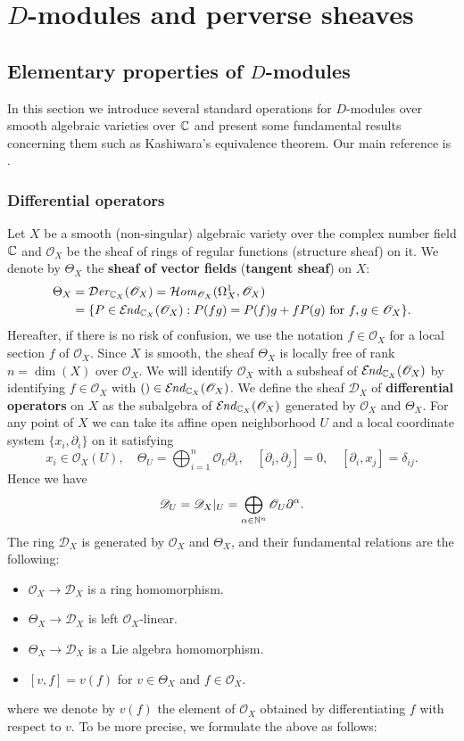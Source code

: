 \chapter{\texorpdfstring{$D$}{D}-modules and perverse sheaves}
\section{Elementary properties of \texorpdfstring{$D$}{D}-modules}
In this section we introduce several standard operations for $D$-modules over smooth algebraic varieties over $\mathbb{C}$ and present some fundamental results concerning them such as Kashiwara's equivalence theorem. Our main reference is \cite{hotta_Dmodule}.
\subsection{Differential operators}
Let $X$ be a smooth (non-singular) algebraic variety over the complex number field $\mathbb{C}$ and $\mathscr{O}_X$ be the sheaf of rings of regular functions (structure sheaf) on it. We denote by $\Theta_X$ the \textbf{sheaf of vector fields} (\textbf{tangent sheaf}) on $X$:
\begin{align*}
\Theta_X&=\operatorname{\mathcal{D}\hspace*{-0.2pt}\textit{er}\hspace{0.5pt}}_{\mathbb{C}_X}(\mathscr{O}_X)=\operatorname{\mathcal{H}\hspace*{-0.4pt}\textit{om}\hspace{0.5pt}}_{\mathscr{O}_X}(\Omega_X^1,\mathscr{O}_X)\\
&=\{P\in\operatorname{\mathcal{E}\hspace*{-1pt}\textit{nd}\hspace{0.5pt}}_{\mathbb{C}_X}(\mathscr{O}_X):\text{$P(fg)=P(f)g+fP(g)$ for $f,g\in\mathscr{O}_X$}\}.
\end{align*}
Hereafter, if there is no risk of confusion, we use the notation $f\in\mathscr{O}_X$ for a local section $f$ of $\mathscr{O}_X$. Since $X$ is smooth, the sheaf $\Theta_X$ is locally free of rank $n=\dim(X)$ over $\mathscr{O}_X$. We will identify $\mathscr{O}_X$ with a subsheaf of $\operatorname{\mathcal{E}\hspace*{-1pt}\textit{nd}\hspace{0.5pt}}_{\mathbb{C}_X}(\mathscr{O}_X)$ by identifying $f\in\mathscr{O}_X$ with $()\in\operatorname{\mathcal{E}\hspace*{-1pt}\textit{nd}\hspace{0.5pt}}_{\mathbb{C}_X}(\mathscr{O}_X)$. We define the sheaf $\mathscr{D}_X$ of \textbf{differential operators} on $X$ as the subalgebra of $\operatorname{\mathcal{E}\hspace*{-1pt}\textit{nd}\hspace{0.5pt}}_{\mathbb{C}_X}(\mathscr{O}_X)$ generated by $\mathscr{O}_X$ and $\Theta_X$. For any point of $X$ we can take its affine open neighborhood $U$ and a local coordinate system $\{x_i,\partial_i\}$ on it satisfying
\[x_i\in\mathscr{O}_X(U),\quad \Theta_U=\bigoplus_{i=1}^{n}\mathscr{O}_U\partial_i,\quad [\partial_i,\partial_j]=0,\quad [\partial_i,x_j]=\delta_{ij}.\]
Hence we have 
\[\mathscr{D}_U=\mathscr{D}_X|_U=\bigoplus_{\alpha\in\mathbb{N}^n}\mathscr{O}_U\partial^\alpha.\]
The ring $\mathscr{D}_X$ is generated by $\mathscr{O}_X$ and $\Theta_X$, and their fundamental relations are the following:
\begin{itemize}
    \item $\mathscr{O}_X\to\mathscr{D}_X$ is a ring homomorphism.
    \item $\Theta_X\to\mathscr{D}_X$ is left $\mathscr{O}_X$-linear.
    \item $\Theta_X\to\mathscr{D}_X$ is a Lie algebra homomorphism.
    \item $[v,f]=v(f)$ for $v\in\Theta_X$ and $f\in\mathscr{O}_X$.
\end{itemize}
where we denote by $v(f)$ the element of $\mathscr{O}_X$ obtained by differentiating $f$ with respect to $v$. To be more precise, we formulate the above as follows:

